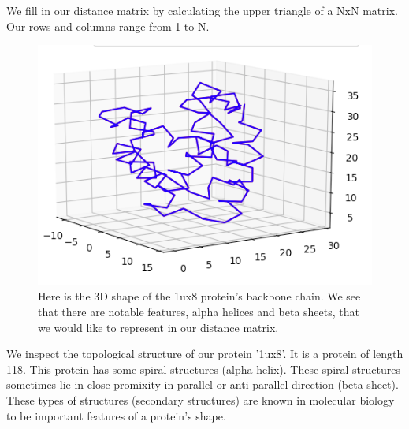 \documentclass[12pt, a4paper, twocolumn, fullpage]{article}
\theoremstyle{plain}
\theoremstyle{definition}
\theoremstyle{remark}
\begin{document}
\begin{algorithm}
\caption{We fill in our distance matrix by calculating the upper triangle of a NxN matrix. Our rows and columns range from 1 to N.}
\begin{algorithmic}
    \ENDFOR
\ENDFOR
\end{algorithmic}
\end{algorithm}

\begin{figure}[h]
    \includegraphics[width=\linewidth]{1ux8pdb.png}
    \caption{Here is the 3D shape of the  1ux8 protein's backbone chain. We see that there are notable features, alpha helices and beta sheets, that we would like to represent in our distance matrix.}
    \label{1ux8pdb}
\end{figure}

We inspect the topological structure of our protein '1ux8'. It is a protein of length 118. This protein has some spiral structures (alpha helix). These spiral structures sometimes lie in close promixity in parallel or anti parallel direction (beta sheet). These types of structures (secondary structures) are known in molecular biology to be important features of a protein's shape.
\end{document}
